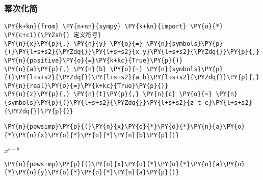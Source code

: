     \hypertarget{ux5e42ux6b21ux5316ux7b80}{%
\subsubsection{幂次化简}\label{ux5e42ux6b21ux5316ux7b80}}

    \begin{tcolorbox}[breakable, size=fbox, boxrule=1pt, pad at break*=1mm,colback=cellbackground, colframe=cellborder]
\begin{Verbatim}[commandchars=\\\{\}]
\PY{k+kn}{from} \PY{n+nn}{sympy} \PY{k+kn}{import} \PY{o}{*}
\PY{c+c1}{\PYZsh{} 定义符号}
\PY{n}{x}\PY{p}{,} \PY{n}{y} \PY{o}{=} \PY{n}{symbols}\PY{p}{(}\PY{l+s+s2}{\PYZdq{}}\PY{l+s+s2}{x y}\PY{l+s+s2}{\PYZdq{}}\PY{p}{,} \PY{n}{positive}\PY{o}{=}\PY{k+kc}{True}\PY{p}{)}
\PY{n}{a}\PY{p}{,} \PY{n}{b} \PY{o}{=} \PY{n}{symbols}\PY{p}{(}\PY{l+s+s2}{\PYZdq{}}\PY{l+s+s2}{a b}\PY{l+s+s2}{\PYZdq{}}\PY{p}{,} \PY{n}{real}\PY{o}{=}\PY{k+kc}{True}\PY{p}{)}
\PY{n}{z}\PY{p}{,} \PY{n}{t}\PY{p}{,} \PY{n}{c} \PY{o}{=} \PY{n}{symbols}\PY{p}{(}\PY{l+s+s2}{\PYZdq{}}\PY{l+s+s2}{z t c}\PY{l+s+s2}{\PYZdq{}}\PY{p}{)}
\end{Verbatim}
\end{tcolorbox}

    \begin{tcolorbox}[breakable, size=fbox, boxrule=1pt, pad at break*=1mm,colback=cellbackground, colframe=cellborder]
\begin{Verbatim}[commandchars=\\\{\}]
\PY{n}{powsimp}\PY{p}{(}\PY{n}{x}\PY{o}{*}\PY{o}{*}\PY{n}{a}\PY{o}{*}\PY{n}{x}\PY{o}{*}\PY{o}{*}\PY{n}{b}\PY{p}{)}
\end{Verbatim}
\end{tcolorbox}
 
            
    
    $\displaystyle x^{a + b}$

    

    \begin{tcolorbox}[breakable, size=fbox, boxrule=1pt, pad at break*=1mm,colback=cellbackground, colframe=cellborder]
\begin{Verbatim}[commandchars=\\\{\}]
\PY{n}{powsimp}\PY{p}{(}\PY{n}{x}\PY{o}{*}\PY{o}{*}\PY{n}{a}\PY{o}{*}\PY{n}{y}\PY{o}{*}\PY{o}{*}\PY{n}{a}\PY{p}{)}
\end{Verbatim}
\end{tcolorbox}
 
